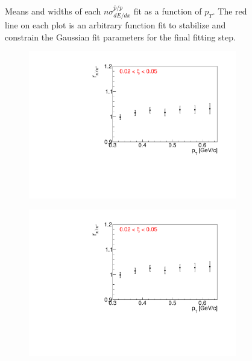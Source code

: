 \begin{figure}[h!]
\begin{subfigure}{.32\textwidth}
		\end{subfigure}
	\caption[Means and widths of each $n\sigma^{\bar{p}/p}_{dE/dx}$ fit as a function of $p_T$.]{Means and widths  of each $n\sigma^{\bar{p}/p}_{dE/dx}$ fit as a function of $p_T$.  The red line on each plot is an arbitrary function fit to stabilize and constrain the Gaussian fit parameters for the final fitting step.}
	\label{fig:dEdx_fit_parameters_P}
	
\end{figure}
\begin{figure}[h!]
	\centering
	\begin{subfigure}{.32\textwidth}
		\includegraphics[width=\linewidth, page=3]{chapters/chrgSTAR/img/dEdx/fit2019_fitResult_1_0_step_0.pdf}
	\end{subfigure}
	\begin{subfigure}{.32\textwidth}
		\includegraphics[width=\linewidth, page=4]{chapters/chrgSTAR/img/dEdx/fit2019_fitResult_1_0_step_0.pdf}

\end{subfigure}
\end{figure}
